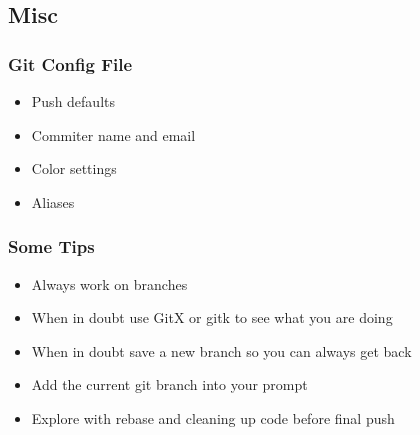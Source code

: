 \documentclass{beamer}
\begin{document}
\subsection{Misc}

\begin{frame}
  \frametitle{Git Config File}
  \begin{itemize}
    \item Push defaults
    \item Commiter name and email
    \item Color settings
    \item Aliases
  \end{itemize}
\end{frame}

\begin{frame}
  \frametitle{Some Tips}
  \begin{itemize}
    \item Always work on branches
      \pause
    \item When in doubt use GitX or gitk to see what you are doing
      \pause
    \item When in doubt save a new branch so you can always get back
      \pause
    \item Add the current git branch into your prompt
      \pause
    \item Explore with rebase and cleaning up code before final push
  \end{itemize}
\end{frame}
\end{document}
